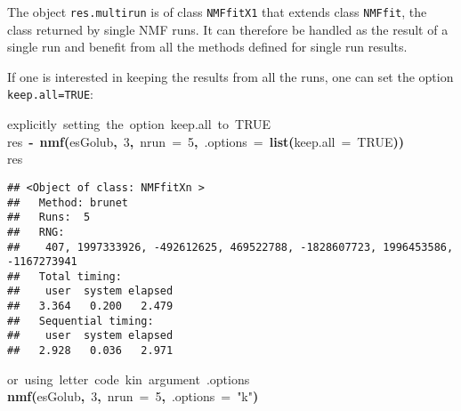 \documentclass[a4paper]{article}\usepackage{graphicx, color}
\makeatletter
\newcommand{\hlnumber}[1]{\textcolor[rgb]{0,0,0}{#1}}%
\newcommand{\hlfunctioncall}[1]{\textcolor[rgb]{0.501960784313725,0,0.329411764705882}{\textbf{#1}}}%
\newcommand{\hlstring}[1]{\textcolor[rgb]{0.6,0.6,1}{#1}}%
\newcommand{\hlkeyword}[1]{\textcolor[rgb]{0,0,0}{\textbf{#1}}}%
\newcommand{\hlargument}[1]{\textcolor[rgb]{0.690196078431373,0.250980392156863,0.0196078431372549}{#1}}%
\newcommand{\hlcomment}[1]{\textcolor[rgb]{0.180392156862745,0.6,0.341176470588235}{#1}}%
\newcommand{\hlassignement}[1]{\textcolor[rgb]{0,0,0}{\textbf{#1}}}%
\newcommand{\hlsymbol}[1]{\textcolor[rgb]{0,0,0}{#1}}%
\newcommand{\hlstd}[1]{\textcolor[rgb]{0,0,0}{#1}}%
\newenvironment{kframe}{%
 \def\FrameCommand##1{\hskip\@totalleftmargin \hskip-\fboxsep
 \colorbox{shadecolor}{##1}\hskip-\fboxsep
     \hskip-\linewidth \hskip-\@totalleftmargin \hskip\columnwidth}%
 \MakeFramed {\advance\hsize-\width
   \@totalleftmargin\z@ \linewidth\hsize
   \@setminipage}}%
 {\par\unskip\endMakeFramed}
\newenvironment{knitrout}{}{} %
\let\code=\texttt
\makeatother
\begin{document}
The object \code{res.multirun} is of class \code{NMFfitX1} that extends class \code{NMFfit}, the class returned by single NMF runs. 
It can therefore be handled as the result of a single run and benefit from all the methods defined for single run results.

\medskip
If one is interested in keeping the results from all the runs, one can set the option \code{keep.all=TRUE}:

\begin{knitrout}
\color{fgcolor}\begin{kframe}
\begin{flushleft}
\ttfamily\noindent
\hlcomment{\usebox{\hlnormalsizeboxhash}{\ }explicitly{\ }setting{\ }the{\ }option{\ }keep.all{\ }to{\ }TRUE}\hspace*{\fill}\\
\hlstd{}\hlsymbol{res}{\ }\hlassignement{\usebox{\hlnormalsizeboxlessthan}-}{\ }\hlfunctioncall{nmf}\hlkeyword{(}\hlsymbol{esGolub}\hlkeyword{,}{\ }\hlnumber{3}\hlkeyword{,}{\ }\hlargument{nrun}{\ }\hlargument{=}{\ }\hlnumber{5}\hlkeyword{,}{\ }\hlargument{.options}{\ }\hlargument{=}{\ }\hlfunctioncall{list}\hlkeyword{(}\hlargument{keep.all}{\ }\hlargument{=}{\ }\hlnumber{TRUE}\hlkeyword{)}\hlkeyword{)}\hspace*{\fill}\\
\hlstd{}\hlsymbol{res}\mbox{}
\normalfont
\end{flushleft}
\begin{verbatim}
## <Object of class: NMFfitXn >
##   Method: brunet 
##   Runs:  5 
##   RNG:
##    407, 1997333926, -492612625, 469522788, -1828607723, 1996453586, -1167273941 
##   Total timing:
##    user  system elapsed 
##   3.364   0.200   2.479 
##   Sequential timing:
##    user  system elapsed 
##   2.928   0.036   2.971 
\end{verbatim}
\end{kframe}
\end{knitrout}


\begin{knitrout}
\color{fgcolor}\begin{kframe}
\begin{flushleft}
\ttfamily\noindent
\hlcomment{\usebox{\hlnormalsizeboxhash}{\ }or{\ }using{\ }letter{\ }code{\ }\usebox{\hlnormalsizeboxsinglequote}k\usebox{\hlnormalsizeboxsinglequote}{\ }in{\ }argument{\ }.options}\hspace*{\fill}\\
\hlstd{}\hlfunctioncall{nmf}\hlkeyword{(}\hlsymbol{esGolub}\hlkeyword{,}{\ }\hlnumber{3}\hlkeyword{,}{\ }\hlargument{nrun}{\ }\hlargument{=}{\ }\hlnumber{5}\hlkeyword{,}{\ }\hlargument{.options}{\ }\hlargument{=}{\ }\hlstring{"{}k"{}}\hlkeyword{)}\mbox{}
\normalfont
\end{flushleft}
\end{kframe}
\end{knitrout}
\end{document}
